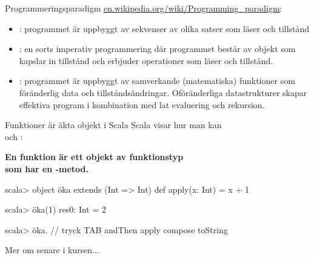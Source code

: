 \begin{Slide}{Programmeringsparadigm}
\href{https://en.wikipedia.org/wiki/Programming_paradigm}{en.wikipedia.org/wiki/Programming\_paradigm}:
\begin{itemize}
\item {}: programmet är uppbyggt av sekvenser av olika satser som läser och  tillstånd
\item {}: en sorts imperativ programmering där programmet består av objekt som kapslar in tillstånd och erbjuder operationer som läser och  tillstånd.
\item {}: programmet är uppbyggt av samverkande (matematiska) funktioner som  föränderlig data och tillståndsändringar. Oföränderliga datastrukturer skapar effektiva program i kombination med lat evaluering och rekursion.
\end{itemize}
\end{Slide}


\begin{Slide}{Funktioner är äkta objekt i Scala}
Scala visar hur man kan   \\  och : \\\vspace{0.5em}

\textbf{\Large En funktion är ett objekt av funktionstyp\\ som har en -metod.}
\pause
\begin{REPLnonum}
scala> object öka extends (Int => Int) {
         def apply(x: Int) = x + 1
       }


scala> öka(1)
res0: Int = 2

scala> öka.   // tryck TAB
andThen   apply   compose   toString
\end{REPLnonum}
Mer om  senare i kursen... %
\end{Slide}



